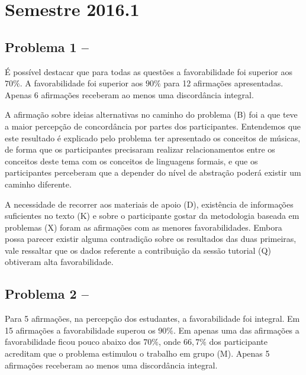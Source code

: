 \section{Semestre 2016.1}
\label{sec-sem-2016}

\subsection{Problema 1 -- \ProblemaA}

É possível destacar que para todas as questões a favorabilidade
foi superior aos $70\%$. A favorabilidade foi superior aos $90\%$
para 12 afirmações apresentadas.
Apenas 6 afirmações receberam ao menos uma discordância integral.

A afirmação sobre ideias alternativas no caminho do problema (B)
foi a que teve a maior percepção de concordância por partes dos
participantes.
Entendemos que este resultado é explicado pelo problema
ter apresentado os conceitos de músicas, de forma que
os participantes precisaram realizar relacionamentos entre
os conceitos deste tema com os conceitos de linguagens
formais, e que os participantes perceberam que a depender do
nível de abstração poderá existir um caminho diferente.


A necessidade de recorrer aos materiais de apoio (D),
existência de informações suficientes no texto (K) e
sobre o participante gostar da metodologia baseada
em problemas (X) foram as afirmações com
as menores favorabilidades.
Embora possa parecer existir alguma contradição
sobre os resultados das duas primeiras, vale
ressaltar que os dados referente
a contribuição da sessão tutorial (Q) obtiveram
alta favorabilidade.


\subsection{Problema 2 -- \ProblemaB}

Para 5 afirmações, na percepção dos estudantes, a favorabilidade foi integral.
Em 15 afirmações a favorabilidade superou os $90\%$.
Em apenas uma das afirmações a favorabilidade ficou pouco abaixo dos $70\%$, onde
$66,7\%$ dos participante acreditam que o problema estimulou
o trabalho em grupo (M).
Apenas 5 afirmações receberam ao menos uma discordância integral.

